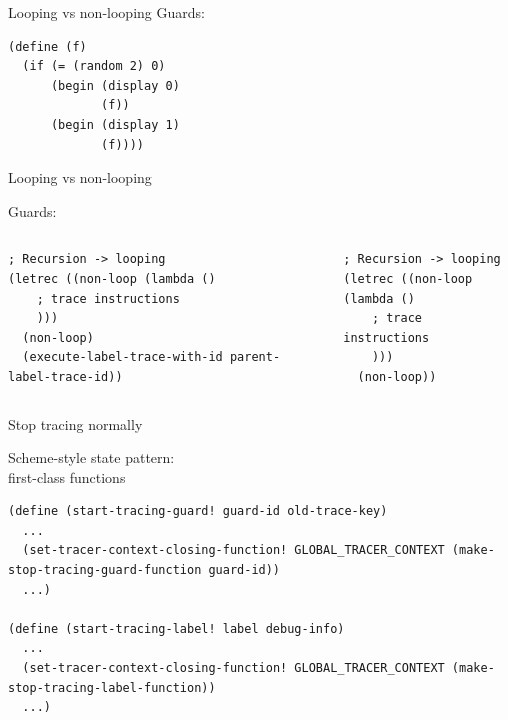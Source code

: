\documentclass{beamer}
\begin{document}
\begin{frame}[fragile]{Looping vs non-looping}
Guards:
\begin{lstlisting}[basicstyle = \scriptsize\ttfamily, escapechar = £]
(define (f)
  (if (= (random 2) 0)
      (begin (display 0)
             (f))
      (begin (display 1)
             (f))))
\end{lstlisting}
\end{frame}

\begin{frame}[fragile]{Looping vs non-looping}

Guards:
\begin{columns}[c]
\begin{lstlisting}[basicstyle = \scriptsize\ttfamily, escapechar = £]
; Recursion -> looping
(letrec ((non-loop (lambda ()
    ; trace instructions
    )))
  (non-loop)
  (execute-label-trace-with-id parent-label-trace-id))
\end{lstlisting}
\pause

\begin{lstlisting}[basicstyle = \scriptsize\ttfamily, escapechar = £]
; Recursion -> looping
(letrec ((non-loop (lambda ()
    ; trace instructions
    )))
  (non-loop))
\end{lstlisting}
\end{columns}

\end{frame}

\begin{frame}[fragile]{Stop tracing normally}

Scheme-style state pattern: \\
first-class functions

\begin{lstlisting}[basicstyle = \scriptsize\ttfamily, escapechar = £]
(define (start-tracing-guard! guard-id old-trace-key)
  ...
  (set-tracer-context-closing-function! GLOBAL_TRACER_CONTEXT (make-stop-tracing-guard-function guard-id))
  ...)
  
(define (start-tracing-label! label debug-info)
  ...
  (set-tracer-context-closing-function! GLOBAL_TRACER_CONTEXT (make-stop-tracing-label-function))
  ...)
\end{lstlisting}

\end{frame}
\end{document}
